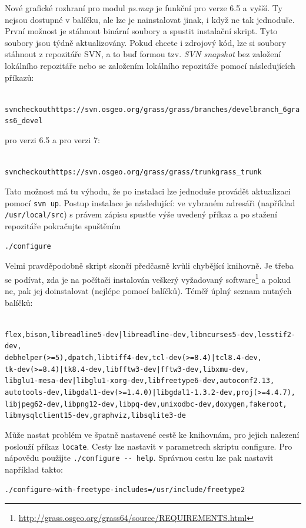 \documentclass[a4paper,12pt,draft]{article}
\newcommand{\modul}[1]{\emph{#1}}
\begin{document}
Nové grafické rozhraní pro modul \modul{ps.map} je funkční pro verze 6.5 a vyšší. Ty nejsou dostupné v balíčku, ale lze je nainstalovat jinak, i když ne tak jednoduše. První možnost je stáhnout binární soubory  a spustit instalační skript. Tyto soubory jsou týdně aktualizovány. Pokud chcete i zdrojový kód, lze si soubory stáhnout z repozitáře SVN, a to buď formou tzv. \emph{SVN snapshot} bez založení lokálního repozitáře nebo se založením lokálního repozitáře pomocí následujících příkazů:
\begin{alltt}
{\footnotesize
svn checkout https://svn.osgeo.org/grass/grass/branches/develbranch_6 grass6_devel}
\end{alltt}
pro verzi 6.5 a pro verzi 7:
\begin{alltt}
{\footnotesize
svn checkout https://svn.osgeo.org/grass/grass/trunk grass_trunk}
\end{alltt}
Tato možnost má tu výhodu, že po instalaci lze jednoduše provádět aktualizaci pomocí \verb|svn up|. Postup instalace je následující: ve vybraném adresáři (například \verb|/usr/local/src|) s právem zápisu spustťe výše uvedený příkaz a po stažení repozitáře pokračujte spuštěním
\begin{alltt}
{\footnotesize ./configure}
\end{alltt}
Velmi pravděpodobně skript skončí předčasně kvůli chybějící knihovně. Je třeba se podívat, zda je na počítači instalován veškerý vyžadovaný software\footnote{\url{http://grass.osgeo.org/grass64/source/REQUIREMENTS.html}} a pokud ne, pak jej doinstalovat (nejlépe pomocí balíčků). Téměř úplný seznam nutných balíčků:
\begin{alltt}
{\footnotesize
flex, bison, libreadline5-dev | libreadline-dev, libncurses5-dev, lesstif2-dev, 
debhelper (>= 5), dpatch, libtiff4-dev, tcl-dev (>= 8.4) | tcl8.4-dev, 
tk-dev (>= 8.4) | tk8.4-dev, libfftw3-dev|fftw3-dev, libxmu-dev, 
libglu1-mesa-dev | libglu1-xorg-dev, libfreetype6-dev, autoconf2.13, 
autotools-dev, libgdal1-dev (>=1.4.0) | libgdal1-1.3.2-dev, proj (>= 4.4.7),
libjpeg62-dev, libpng12-dev, libpq-dev, unixodbc-dev, doxygen, fakeroot, 
libmysqlclient15-dev, graphviz, libsqlite3-de
}
\end{alltt}
Může nastat problém ve špatně nastavené cestě ke knihovnám, pro jejich nalezení poslouží příkaz \verb|locate|. Cesty lze nastavit v parametrech skriptu configure. Pro nápovědu použijte \verb|./configure -- help|. Správnou cestu lze pak nastavit například takto:
\begin{alltt}
{\footnotesize./configure --with-freetype-includes=/usr/include/freetype2   }
\end{alltt}
\end{document}
